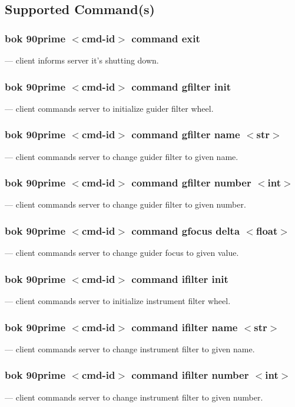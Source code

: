 \documentclass[12pt,twoside]{article}
\begin{document}
\subsection{Supported Command(s)}

\subsubsection{bok 90prime $<$cmd-id$>$ command exit}
  --- client informs server it's shutting down.

\subsubsection{bok 90prime $<$cmd-id$>$ command gfilter init}
  --- client commands server to initialize guider filter wheel.
 
\subsubsection{bok 90prime $<$cmd-id$>$ command gfilter name $<$str$>$}
  --- client commands server to change guider filter to given name.
 
\subsubsection{bok 90prime $<$cmd-id$>$ command gfilter number $<$int$>$}
  --- client commands server to change guider filter to given number.
 
\subsubsection{bok 90prime $<$cmd-id$>$ command gfocus delta $<$float$>$}
  --- client commands server to change guider focus to given value.

\subsubsection{bok 90prime $<$cmd-id$>$ command ifilter init}
  --- client commands server to initialize instrument filter wheel.

\subsubsection{bok 90prime $<$cmd-id$>$ command ifilter name $<$str$>$}
  --- client commands server to change instrument filter to given name.

\subsubsection{bok 90prime $<$cmd-id$>$ command ifilter number $<$int$>$}
  --- client commands server to change instrument filter to given number.
 
\end{document}
